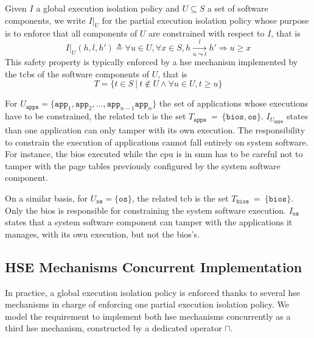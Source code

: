 \begin{definition}
  \label{def:speccert:partial}
  Given $I$ a global execution isolation policy and $U \subseteq S$ a set of
  software components, we write $I|_{U}$ for the partial execution isolation
  policy whose purpose is to enforce that all components of $U$ are constrained
  with respect to $I$, that is
  \[
    I|_{U}(h, l, h') \triangleq \forall u \in U, \forall x \in S, h
    \xrightarrow[u \leadsto t]{l} h' \Rightarrow u \ge x
  \]
  This safety property is typically enforced by a \ac{hse} mechanism implemented
  by the \acp{tcb} of the software components of $U$, that is
  \[
    T = \{ t \in S\ |\ t \not\in U \wedge \forall u \in U, t \ge u \}
  \]
\end{definition}

\begin{example}
  For
  $U_{\mathtt{apps}} = \{ \mathtt{app}_1, \mathtt{app}_2, \ldots,
  \mathtt{app}_{n-1} \mathtt{app}_{n} \}$ the set of applications whose
  executions have to be constrained, the related \ac{tcb} is the set
  $T_{\mathtt{apps}}~=~\{ \mathtt{bios}, \mathtt{os} \}$.
  $I_{U_{\mathtt{apps}}}$ states than one application can only tamper with its
  own execution.
  The responsibility to constrain the execution of applications cannot fall
  entirely on system software.
  For instance, the \ac{bios} executed while the \ac{cpu} is in \ac{smm} has to
  be careful not to tamper with the page tables previously configured by the
  system software component.

  On a similar basis, for $U_{\mathtt{os}} = \{ \mathtt{os} \}$, the related
  \ac{tcb} is the set $T_{\mathtt{bios}}~=~\{ \mathtt{bios} \}$.
  Only the \ac{bios} is responsible for constraining the system software
  execution.
  $I_{\mathtt{os}}$ states that a system software component can tamper with the
  applications it manages, with its own execution, but not the \ac{bios}'s.
\end{example}

\subsection{HSE Mechanisms Concurrent Implementation}
\label{subsec:speccert:coop}

In practice, a global execution isolation policy is enforced thanks to several
\ac{hse} mechanisms in charge of enforcing one partial execution isolation
policy.
%
We model the requirement to implement both \ac{hse} mechanisms concurrently as a
third \ac{hse} mechanism, constructed by a dedicated operator $\sqcap$.

